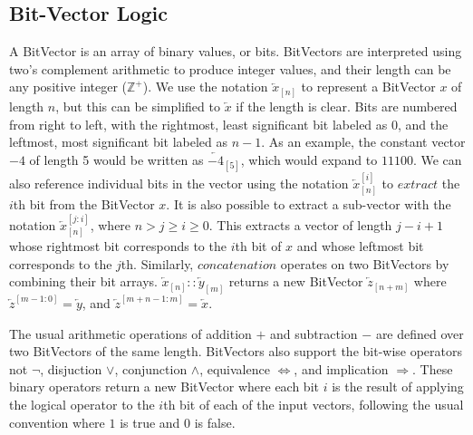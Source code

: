 \documentclass[a4paper,12pt]{article}
\begin{document}
\subsection{Bit-Vector Logic}
\label{sec:org21c4268}
A BitVector is an array of binary values, or bits. BitVectors are interpreted
using two's complement arithmetic to produce integer values, and their length
can be any positive integer (\(\mathbb{Z}^+\)). We use the notation
\(\overleftarrow{x}_{[n]}\) to represent a BitVector \(x\) of length \(n\), but
this can be simplified to \(\overleftarrow{x}\) if the length is clear. Bits are
numbered from right to left, with the rightmost, least significant bit labeled
as 0, and the leftmost, most significant bit labeled as \(n-1\). As an example,
the constant vector \(-4\) of length 5 would be written as
\(\overleftarrow{-4}_{[5]}\), which would expand to \(11100\). We can also
reference individual bits in the vector using the notation
\(\overleftarrow{x}_{[n]}^{[i]}\) to \(extract\) the \(i\)th bit from the
BitVector \(x\). It is also possible to extract a sub-vector with the notation
\(\overleftarrow{x}_{[n]}^{[j:i]}\), where \(n>j\geq i\geq 0\). This extracts a
vector of length \(j-i+1\) whose rightmost bit corresponds to the \(i\)th bit of
\(x\) and whose leftmost bit corresponds to the \(j\)th. Similarly,
\(concatenation\) operates on two BitVectors by combining their bit arrays.
\(\overleftarrow{x}_{[n]} :: \overleftarrow{y}_{[m]}\) returns a new BitVector
\(\overleftarrow{z}_{[n+m]}\) where \(\overleftarrow{z}^{[m-1:0]} =
\overleftarrow{y}\), and \(\overleftarrow{z}^{[m+n-1:m]} = \overleftarrow{x}\).

The usual arithmetic operations of addition \(+\) and subtraction \(-\) are
defined over two BitVectors of the same length. BitVectors also support the
bit-wise operators not \(\neg\), disjuction \(\lor\), conjunction \(\land\),
equivalence \(\iff\), and implication \(\Rightarrow\). These binary operators return a
new BitVector where each bit \(i\) is the result of applying the logical
operator to the \(i\)th bit of each of the input vectors, following the usual
convention where \(1\) is true and \(0\) is false.
\end{document}
